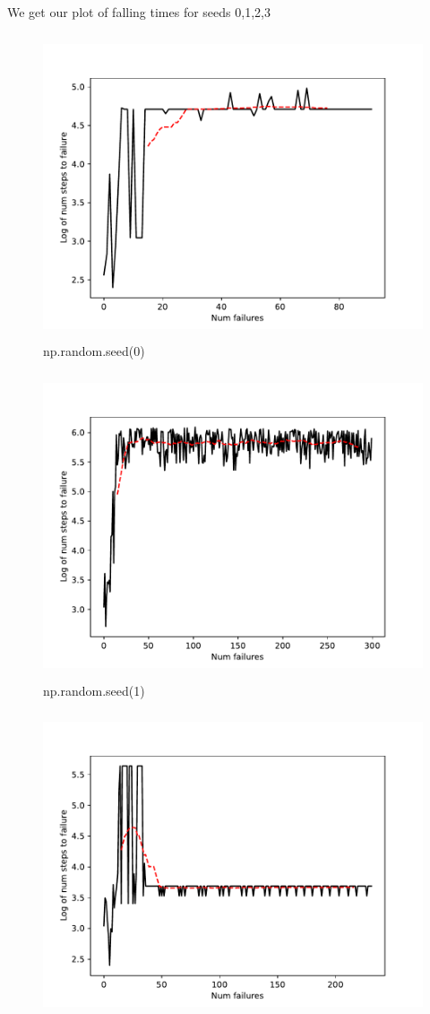%
%
\begin{answer}
We get our plot of falling times for seeds 0,1,2,3
\begin{figure}[H]
	\includegraphics[width=15cm,height=9cm,keepaspectratio]{../src/cartpole/control_seed0.pdf}
	\caption{np.random.seed(0)}
\end{figure}
\begin{figure}[H]
	\includegraphics[width=15cm,height=9cm,keepaspectratio]{../src/cartpole/control_seed1.pdf}
	\caption{np.random.seed(1)}
\end{figure}
\begin{figure}[H]
	\includegraphics[width=15cm,height=9cm,keepaspectratio]{../src/cartpole/control_seed2.pdf}

\end{figure}
\end{answer}
